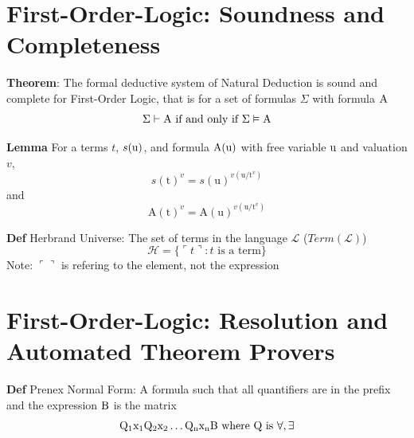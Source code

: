 \documentclass[11pt,notitlepage]{report}
\newcommand{\mc}[1]{\ensuremath{\mathcal{#1}}}
\newcommand{\mr}[1]{\ensuremath{\mathrm{#1}}}
\newcommand{\tbf}[1]{\textbf{#1}}
\begin{document}
\setcounter{section}{13}
\section{First-Order-Logic: Soundness and Completeness}

\tbf{Theorem}: The formal deductive system of Natural Deduction is sound and complete for First-Order Logic, that is for a set of formulas $\Sigma$ with formula $\rm A$
$$\Sigma \vdash \rm A \text{ if and only if } \Sigma \vDash \rm A$$

\tbf{Lemma} For a terms $t$, $s(\rm u)$, and formula $\rm A(u)$ with free variable $\rm u$ and valuation $v$, 
$$s(\mr{t})^v = s(\mr{u})^{v(\mr{u}/\mr{t}^v)}$$
and
$$\mr{A}(\mr{t})^v = \mr{A}(\mr{u})^{v(\mr{u}/\mr{t}^v)}$$

\tbf{Def} Herbrand Universe: The set of terms in the language $\mc L$ ($Term(\mc L)$)
$$\mc H = \{\ulcorner t \urcorner: t \text{ is a term}\}$$
\hspace*{5mm} Note: $\ulcorner \urcorner$ is refering to the element, not the expression

\newpage

\section{First-Order-Logic: Resolution and Automated Theorem Provers}

\tbf{Def} Prenex Normal Form: A formula such that all quantifiers are in the prefix and the expression $\rm B$ is the matrix
$$\rm Q_1x_1 Q_2x_2 \dots Q_nx_n B \text{ where }Q \text{ is } \forall, \exists$$
\end{document}
